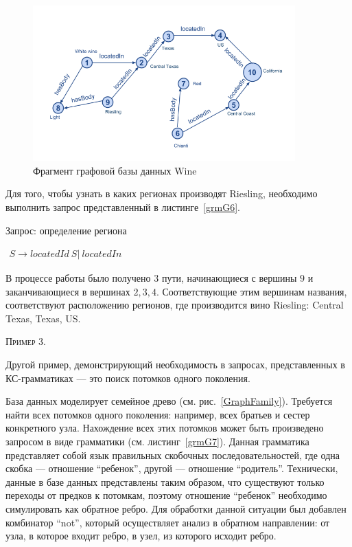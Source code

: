 \begin{figure}
 \centering
 \includegraphics[width=0.9\textwidth]{Smolina/pics/GraphWine.png}
 \caption{Фрагмент графовой базы данных Wine}
 \label{GraphWine}
\end{figure}

Для того, чтобы узнать в каких регионах производят Riesling, необходимо выполнить запрос представленный в листинге~\ref{grmG6}. 

\begin{listing}
\caption{Запрос: определение региона}
\label{grmG6}
\centering
$\begin{array}{rl}
S \rightarrow locatedId \ S | \ locatedIn
\end{array}$
 \end{listing}

В процессе работы было получено 3 пути, начинающиеся с вершины $9$ и заканчивающиеся в вершинах $2, 3, 4$. Соответствующие этим вершинам названия, соответствуют расположению регионов, где производится вино Riesling: Central Texas, Texas, US.
 
 \textsc{Пример 3.}

Другой пример, демонстрирующий необходимость в запросах, представленных в КС-грамматиках --- это поиск потомков одного поколения.

База данных моделирует семейное древо (см. рис.~\ref{GraphFamily}). Требуется найти всех потомков одного поколения: например, всех братьев и сестер конкретного узла. Нахождение всех этих потомков может быть произведено запросом в виде грамматики (см. листинг~\ref{grmG7}). Данная грамматика представляет собой язык правильных скобочных последовательностей, где одна скобка --- отношение ``ребенок'', другой --- отношение ``родитель''. Технически, данные в базе данных представлены таким образом, что существуют только переходы от предков к потомкам, поэтому отношение ``ребенок'' необходимо симулировать как обратное ребро. Для обработки данной ситуации был добавлен комбинатор ``not'', который осуществляет анализ в обратном направлении: от узла, в которое входит ребро, в узел, из которого исходит ребро.

